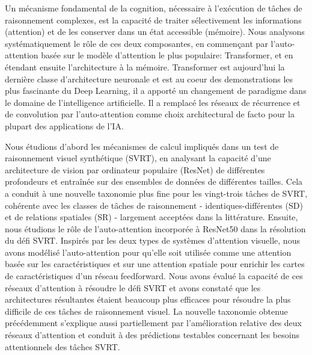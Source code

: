 
Un m\'ecanisme fondamental de la cognition, n\'ecessaire \`a l'ex\'ecution de tâches de raisonnement complexes, est la capacit\'e de traiter s\'electivement les informations (attention) et de les conserver dans un \'etat accessible (m\'emoire). Nous analysons syst\'ematiquement le rôle de ces deux composantes, en commençant par l'auto-attention bas\'ee sur le modèle d'attention le plus populaire: Transformer, et en \'etendant ensuite l'architecture \`a la m\'emoire. Transformer est aujourd'hui la dernière classe d'architecture neuronale et est au coeur des demonstrations les plus fascinante du Deep Learning, il a apport\'e un changement de paradigme dans le domaine de l'intelligence artificielle. Il a remplac\'e les r\'eseaux de r\'ecurrence et de convolution par l'auto-attention comme choix architectural de facto pour la plupart des applications de l'IA.


Nous \'etudions d'abord les m\'ecanismes de calcul impliqu\'es dans un test de raisonnement visuel synth\'etique (SVRT), en analysant la capacit\'e d'une architecture de vision par ordinateur populaire (ResNet) de diff\'erentes profondeurs et entraîn\'ee sur des ensembles de donn\'ees de diff\'erentes tailles. Cela a conduit \`a une nouvelle taxonomie plus fine pour les vingt-trois tâches de SVRT, coh\'erente avec les classes de tâches de raisonnement - identiques-diff\'erentes (SD) et de relations spatiales (SR) - largement accept\'ees dans la litt\'erature. Ensuite, nous \'etudions le rôle de l'auto-attention incorpor\'ee \`a ResNet50 dans la r\'esolution du d\'efi SVRT. Inspir\'es par les deux types de systèmes d'attention visuelle, nous avons mod\'elis\'e l'auto-attention pour qu'elle soit utilis\'ee comme une attention bas\'ee sur les caract\'eristiques et sur une attention spatiale pour enrichir les cartes de caract\'eristiques d'un r\'eseau feedforward. Nous avons \'evalu\'e la capacit\'e de ces r\'eseaux d'attention \`a r\'esoudre le d\'efi SVRT et avons constat\'e que les architectures r\'esultantes \'etaient beaucoup plus efficaces pour r\'esoudre la plus difficile de ces tâches de raisonnement visuel. La nouvelle taxonomie obtenue pr\'ec\'edemment s'explique aussi partiellement par l'am\'elioration relative des deux r\'eseaux d'attention et conduit \`a des pr\'edictions testables concernant les besoins attentionnels des tâches SVRT. 

